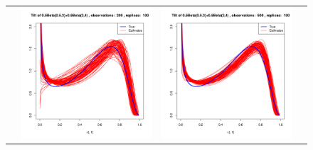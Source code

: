 \begin{figure}[h]
\begin{tabular}{cccc}
	&
	\includegraphics[width=\textwidth/4]{../img/p05_a05_b3_p05_a2_b4/tilted/K1/densities/n200_R100.pdf}
	&
	\includegraphics[width=\textwidth/4]{../img/p05_a05_b3_p05_a2_b4/tilted/K1/densities/n500_R100.pdf}\\
	

\end{tabular}
\end{figure}
